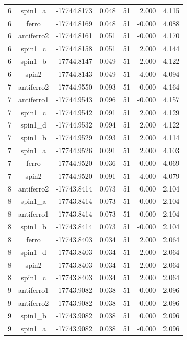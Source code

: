 \begin{longtable}{@{}ccrrrrr@{}}
6 & spin1\_a & -17744.8173 & 0.048 & 51 & 2.000 & 4.115 \\
6 & ferro & -17744.8169 & 0.048 & 51 & -0.000 & 4.088 \\
6 & antiferro2 & -17744.8161 & 0.051 & 51 & -0.000 & 4.170 \\
6 & spin1\_c & -17744.8158 & 0.051 & 51 & 2.000 & 4.144 \\
6 & spin1\_b & -17744.8147 & 0.049 & 51 & 2.000 & 4.122 \\
6 & spin2 & -17744.8143 & 0.049 & 51 & 4.000 & 4.094 \\
\rowcolor{gray!20} 7 & antiferro2 & -17744.9550 & 0.093 & 51 & -0.000 & 4.164 \\
7 & antiferro1 & -17744.9543 & 0.096 & 51 & -0.000 & 4.157 \\
7 & spin1\_c & -17744.9542 & 0.091 & 51 & 2.000 & 4.129 \\
7 & spin1\_d & -17744.9532 & 0.094 & 51 & 2.000 & 4.122 \\
7 & spin1\_b & -17744.9529 & 0.093 & 51 & 2.000 & 4.114 \\
7 & spin1\_a & -17744.9526 & 0.091 & 51 & 2.000 & 4.103 \\
7 & ferro & -17744.9520 & 0.036 & 51 & 0.000 & 4.069 \\
7 & spin2 & -17744.9520 & 0.091 & 51 & 4.000 & 4.079 \\
\rowcolor{gray!20} 8 & antiferro2 & -17743.8414 & 0.073 & 51 & 0.000 & 2.104 \\
8 & spin1\_a & -17743.8414 & 0.073 & 51 & 0.000 & 2.104 \\
8 & antiferro1 & -17743.8414 & 0.073 & 51 & -0.000 & 2.104 \\
8 & spin1\_b & -17743.8414 & 0.073 & 51 & -0.000 & 2.104 \\
8 & ferro & -17743.8403 & 0.034 & 51 & 2.000 & 2.064 \\
8 & spin1\_d & -17743.8403 & 0.034 & 51 & 2.000 & 2.064 \\
8 & spin2 & -17743.8403 & 0.034 & 51 & 2.000 & 2.064 \\
8 & spin1\_c & -17743.8403 & 0.034 & 51 & 2.000 & 2.064 \\
\rowcolor{gray!20} 9 & antiferro1 & -17743.9082 & 0.038 & 51 & 0.000 & 2.096 \\
9 & antiferro2 & -17743.9082 & 0.038 & 51 & 0.000 & 2.096 \\
9 & spin1\_b & -17743.9082 & 0.038 & 51 & 0.000 & 2.096 \\
9 & spin1\_a & -17743.9082 & 0.038 & 51 & -0.000 & 2.096 \\

\end{longtable}
